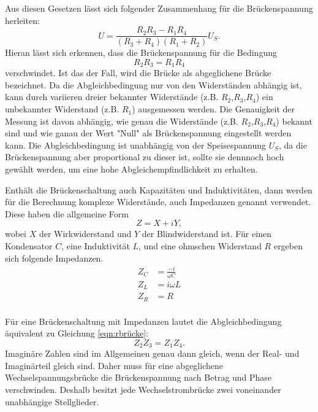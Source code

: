 \noindent Aus diesen Gesetzen lässt sich folgender Zusammenhang für die Brückenspannung
herleiten:
\begin{equation}
  U=\frac{R_{2}R_{3}-R_{1}R_{4}}{(R_{3}+R_{4})(R_{1}+R_{2})}U_{S}.
  \label{eqn:ubrücke}
\end{equation}
\noindent Hieran lässt sich erkennen, dass die Brückenspannung für die Bedingung
\begin{equation}
  R_{2}R_{3}=R_{1}R_{4}
  \label{eqn:rbrücke}
\end{equation}
verschwindet. Ist das der Fall, wird die Brücke als abgeglichene Brücke bezeichnet.
Da die Abgleichbedingung nur von den Widerständen abhängig ist, kann durch
variieren dreier bekannter Widerstände (z.B. $R_{2}$,$R_{3}$,$R_{4}$) ein unbekannter
Widerstand (z.B. $R_{1}$) ausgemessen werden. Die Genauigkeit der Messung ist davon
abhängig, wie genau die Widerstände (z.B. $R_{2}$,$R_{3}$,$R_{4}$) bekannt sind und wie
ganau der Wert "Null" als Brückenspannung eingestellt werden kann.
Die Abgleichbedingung ist unabhängig von der Speisespannung $U_{S}$, da
die Brückenspannung aber proportional zu dieser ist, sollte sie
dennnoch hoch gewählt werden, um eine hohe Abgleichempfindlichkeit zu erhalten.

\noindent Enthält die Brückenschaltung auch Kapazitäten und
Induktivitäten, dann werden für die Berechnung komplexe
Widerstände, auch Impedanzen genannt verwendet. Diese haben die allgemeine Form
\begin{equation}
  Z = X + iY,
\end{equation}
wobei $X$ der Wirkwiderstand und $Y$ der Blindwiderstand ist. Für einen
Kondensator $C$, eine Induktivität $L$, und eine ohmschen Widerstand $R$
ergeben sich folgende Impedanzen.
\begin{align*}
  Z_{C} &= \frac{-i}{\omega C} \\
  Z_{L} &= i \omega L\\
  Z_{R} &= R\\
\end{align*}

\noindent Für eine Brückenschaltung mit Impedanzen lautet die Abgleichbedingung äquivalent zu
Gleichung \ref{eqn:rbrücke}:
\begin{equation}
  Z_{2}Z_{3}=Z_{1}Z_{4}.
  \label{eqn:zbrücke}
\end{equation}
\noindent Imaginäre Zahlen sind im Allgemeinen genau dann gleich, wenn der Real- und
Imaginärteil gleich sind. Daher muss für eine abgeglichene Wechselspannungsbrücke
die Brückenspannung nach Betrag und Phase verschwinden.
Deshalb besitzt jede Wechselstrombrücke zwei voneinander unabhängige Stellglieder.

